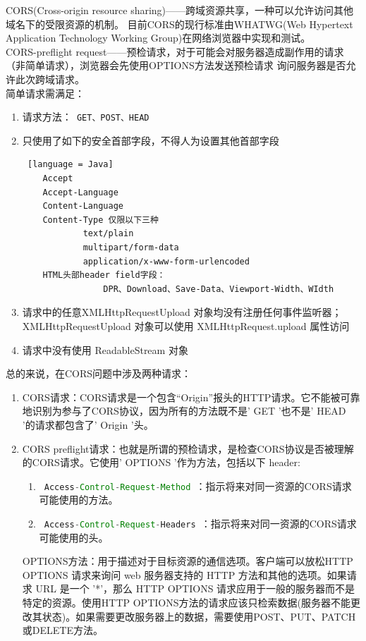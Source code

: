 \begin{enumerate}
        CORS(Cross-origin resource sharing)——跨域资源共享，一种可以允许访问其他域名下的受限资源的机制。
        目前CORS的现行标准由WHATWG(Web Hypertext Application Technology Working Group)在网络浏览器中实现和测试。\\
        CORS-preflight request——预检请求，对于可能会对服务器造成副作用的请求（非简单请求），浏览器会先使用OPTIONS方法发送预检请求
        询问服务器是否允许此次跨域请求。\\
        简单请求需满足：
        \begin{enumerate}
          \item 请求方法：\lstinline[language = xml]| GET、POST、HEAD |
          \item 只使用了如下的安全首部字段，不得人为设置其他首部字段\begin{lstlisting} [language = Java]
    Accept
    Accept-Language
    Content-Language
    Content-Type 仅限以下三种
            text/plain
            multipart/form-data
            application/x-www-form-urlencoded
    HTML头部header field字段：
                DPR、Download、Save-Data、Viewport-Width、WIdth
              \end{lstlisting}
          \item 请求中的任意XMLHttpRequestUpload 对象均没有注册任何事件监听器；XMLHttpRequestUpload 对象可以使用 XMLHttpRequest.upload 属性访问
          \item 请求中没有使用 ReadableStream 对象
        \end{enumerate}
        总的来说，在CORS问题中涉及两种请求：
        \begin{enumerate}
          \item CORS请求：CORS请求是一个包含“Origin”报头的HTTP请求。它不能被可靠地识别为参与了CORS协议，因为所有的方法既不是' GET '也不是' HEAD '的请求都包含了' Origin '头。
          \item CORS preflight请求：也就是所谓的预检请求，是检查CORS协议是否被理解的CORS请求。它使用' OPTIONS '作为方法，包括以下 header:
                \begin{enumerate}
                  \item \lstinline[language = Java]| Access-Control-Request-Method |：指示将来对同一资源的CORS请求可能使用的方法。
                  \item \lstinline[language = Java]| Access-Control-Request-Headers |：指示将来对同一资源的CORS请求可能使用的头。
                \end{enumerate}
                OPTIONS方法：用于描述对于目标资源的通信选项。客户端可以放松HTTP OPTIONS 请求来询问 web 服务器支持的 HTTP 方法和其他的选项。如果请求 URL 是一个 '*'，那么 HTTP OPTIONS 请求应用于一般的服务器而不是特定的资源。使用HTTP OPTIONS方法的请求应该只检索数据(服务器不能更改其状态)。如果需要更改服务器上的数据，需要使用POST、PUT、PATCH或DELETE方法。

\end{enumerate}
\end{enumerate}
